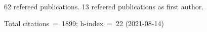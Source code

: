 62 refereed publications. 13 refeered publications as first author.

Total citations~=~1899; h-index~=~22 (2021-08-14)